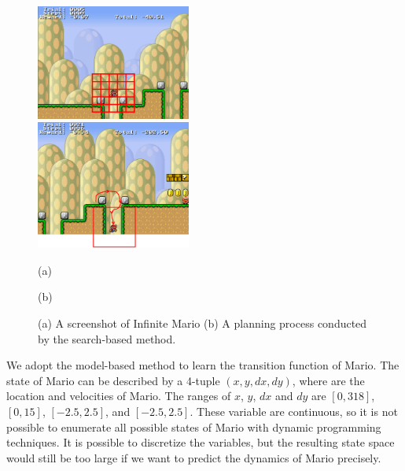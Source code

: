 \begin{figure}[t]
 \begin{minipage}[b]{0.45\linewidth}
    \begin{center}
    \includegraphics[width=2.0in] {./figures/MarioGrid.eps}
\end{center}
\end{minipage}
\begin{minipage}[b]{0.45\linewidth}
    \begin{center}
    \includegraphics[width=2.0in] {./figures/MarioModel.eps}
\end{center}
\end{minipage}
\begin{minipage}[b]{0.45\linewidth} \centering (a) \end{minipage}
\begin{minipage}[b]{0.45\linewidth} \centering (b) \end{minipage}

\caption{(a) A screenshot of Infinite Mario (b) A planning process conducted by the search-based method.}
\label{fig:Mario}
\end{figure}


We adopt the model-based method to learn the transition function of Mario.
The state of Mario 
can be described by a 4-tuple $(x, y, dx, dy)$, where are the location and velocities of Mario. 
The ranges of $x$, $y$, $dx$ and $dy$ are $[0, 318]$, $[0, 15]$, $[-2.5, 2.5]$, and $[-2.5, 2.5]$.
These variable are continuous, so it is not possible to enumerate all possible states
of Mario with dynamic programming techniques. It is possible to discretize the variables, but the resulting state space 
would still be too large if we want to predict the dynamics of Mario precisely.

